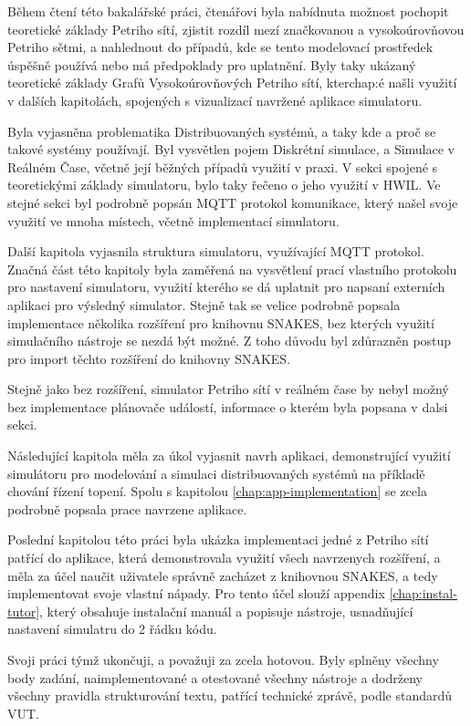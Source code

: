 Během čtení této bakalářské práci, čtenářovi byla nabídnuta možnost pochopit teoretické základy Petriho sítí, zjistit rozdíl mezí značkovanou a vysokoúrovňovou Petriho sětmi, a nahlednout do případů, kde se tento modelovací prostředek úspěšně používá nebo má předpoklady pro uplatnění. Byly taky ukázaný teoretické základy Grafů Vysokoúrovňových Petriho sítí, kterchap:é našli využití v dalších kapitolách, spojených s vizualizací navržené aplikace simulatoru.

Byla vyjasněna problematika Distribuovaných systémů, a taky kde a proč se takové systémy používají. Byl vysvětlen pojem Diskrétní simulace, a Simulace v Reálném Čase, včetně její běžných případů využití v praxi. V sekci spojené s teoretickými základy simulatoru, bylo taky řečeno o jeho využití v HWIL. Ve stejné sekci byl podrobně popsán MQTT protokol komunikace, který našel svoje využití ve mnoha místech, včetně implementací simulatoru.

Další kapitola vyjasnila struktura simulatoru, využívající MQTT protokol. Značná část této kapitoly byla zaměřená na vysvětlení prací vlastního protokolu pro nastavení simulatoru, využití kterého se dá uplatnit pro napsaní externích aplikaci pro výsledný simulator. Stejně tak se velice podrobně popsala implementace několika rozšíření pro knihovnu SNAKES, bez kterých využití simulačního nástroje se nezdá být možné. Z toho důvodu byl zdůrazněn postup pro import těchto rozšíření do knihovny SNAKES.

Stejně jako bez rozšíření, simulator Petriho sítí v reálném čase by nebyl možný bez implementace plánovače událostí, informace o kterém byla popsana v dalsi sekci.

Následující kapitola měla za úkol vyjasnit navrh aplikaci, demonstrující využití simulátoru pro modelování a simulaci distribuovaných systémů na příkladě chování řízení topení. Spolu s kapitolou \ref{chap:app-implementation} se zcela podrobně popsala prace navrzene aplikace.

Poslední kapitolou této práci byla ukázka implementaci jedné z Petriho sítí patřící do aplikace, která demonstrovala využití všech navrzenych rozšíření, a měla za účel naučit uživatele správně zacházet z knihovnou SNAKES, a tedy implementovat svoje vlastní nápady. Pro tento účel slouží appendix \ref{chap:instal-tutor}, který obsahuje instalační manuál a popisuje nástroje, usnadňující nastavení simulatru do 2 řádku kódu.

Svoji práci týmž ukončuji, a považuji za zcela hotovou. Byly splněny všechny body zadání, naimplementované a otestované všechny nástroje a dodrženy všechny pravidla strukturování textu, patřící technické zprávě, podle standardů VUT.






